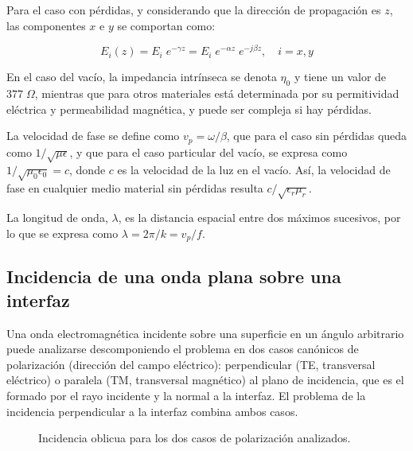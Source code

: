Para el caso con pérdidas, y considerando que la dirección de propagación es $z$, las componentes $x$ e $y$ se comportan como:

\begin{equation}
E_i(z) = E_i \; e^{-\gamma z} = E_i \; e^{-\alpha z} \; e^{-j \beta z}, \quad i=x,y \nonumber
\end{equation}

En el caso del vacío, la impedancia intrínseca se denota $\eta_0$ y tiene un valor de $377\; \Omega$, mientras que para otros materiales está determinada por su permitividad eléctrica y permeabilidad magnética, y puede ser compleja si hay pérdidas.

La velocidad de fase se define como $v_p=\omega/\beta$, que para el caso sin pérdidas queda como $1/\sqrt{\mu \epsilon}$, y que para el caso particular del vacío, se expresa como $1/\sqrt{\mu_0 \epsilon_0} = c$, donde $c$ es la velocidad de la luz en el vacío. Así, la velocidad de fase en cualquier medio material sin pérdidas resulta $c/\sqrt{\epsilon_r \mu_r}$.

La longitud de onda, $\lambda$, es la distancia espacial entre dos máximos sucesivos, por lo que se expresa como $\lambda = 2\pi / k = v_p/f$.

\subsection{Incidencia de una onda plana sobre una interfaz}

Una onda electromagnética incidente sobre una superficie en un ángulo arbitrario puede analizarse descomponiendo el problema en dos casos canónicos de polarización (dirección del campo eléctrico): perpendicular (TE, transversal eléctrico) o paralela (TM, transversal magnético) al plano de incidencia, que es el formado por el rayo incidente y la normal a la interfaz. El problema de la incidencia perpendicular a la interfaz combina ambos casos.

\begin{figure} [H]
	\centering 
	\hspace{5mm}
	\caption{Incidencia oblicua para los dos casos de polarización analizados.}
	\label{fig:oblique_incidence}
\end{figure}

